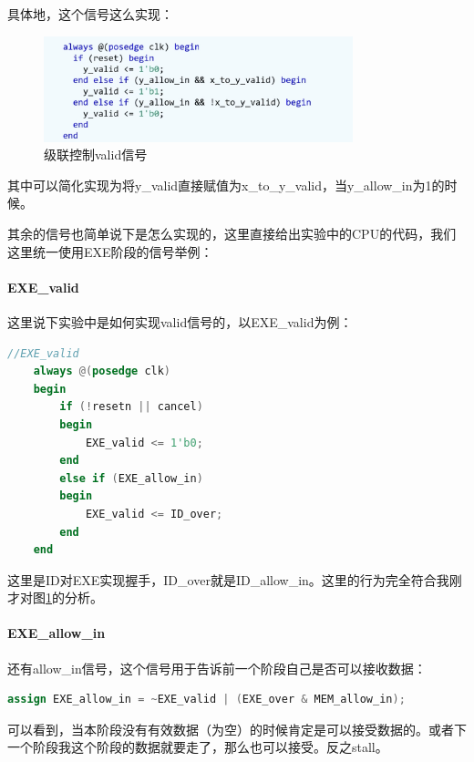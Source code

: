 \documentclass[a4paper]{article}
\begin{document}
具体地，这个信号这么实现：

\begin{figure}[H]
    \centering
    \includegraphics[width=0.8\textwidth]{img/复现流水线/级联控制valid信号.png}
    \caption{级联控制valid信号}
    \label{fig:级联控制valid信号}
\end{figure}

其中可以简化实现为将y\_valid直接赋值为x\_to\_y\_valid，当y\_allow\_in为1的时候。

其余的信号也简单说下是怎么实现的，这里直接给出实验中的CPU的代码，我们这里统一使用EXE阶段的信号举例：

\paragraph{EXE\_valid}这里说下实验中是如何实现valid信号的，以EXE\_valid为例：

\begin{lstlisting}[language=Verilog]
    //EXE_valid
    always @(posedge clk)
    begin
        if (!resetn || cancel)
        begin
            EXE_valid <= 1'b0;
        end
        else if (EXE_allow_in)
        begin
            EXE_valid <= ID_over;
        end
    end
\end{lstlisting}

这里是ID对EXE实现握手，ID\_over就是ID\_allow\_in。这里的行为完全符合我刚才对图\ref{fig:级联控制valid信号}的分析。

\paragraph{EXE\_allow\_in}

还有allow\_in信号，这个信号用于告诉前一个阶段自己是否可以接收数据：

\begin{lstlisting}[language=Verilog]
    assign EXE_allow_in = ~EXE_valid | (EXE_over & MEM_allow_in);
\end{lstlisting}

可以看到，当本阶段没有有效数据（为空）的时候肯定是可以接受数据的。或者下一个阶段我这个阶段的数据就要走了，那么也可以接受。反之stall。
\end{document}
